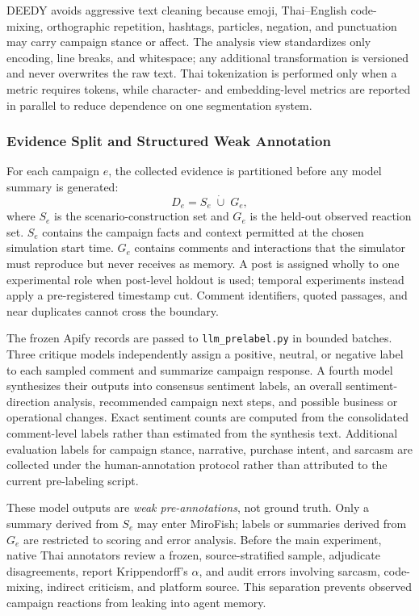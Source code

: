 \documentclass[conference]{IEEEtran}
\begin{document}
DEEDY avoids aggressive text cleaning because emoji, Thai--English
code-mixing, orthographic repetition, hashtags, particles, negation, and
punctuation may carry campaign stance or affect. The analysis view standardizes
only encoding, line breaks, and whitespace; any additional transformation is
versioned and never overwrites the raw text. Thai tokenization is performed
only when a metric requires tokens, while character- and embedding-level
metrics are reported in parallel to reduce dependence on one segmentation
system.

\subsubsection{Evidence Split and Structured Weak Annotation}

For each campaign $e$, the collected evidence is partitioned before any model
summary is generated:
\begin{equation}
    D_e = S_e \;\dot\cup\; G_e,
\end{equation}
where $S_e$ is the scenario-construction set and $G_e$ is the held-out observed
reaction set. $S_e$ contains the campaign facts and context permitted at the
chosen simulation start time. $G_e$ contains comments and interactions that
the simulator must reproduce but never receives as memory. A post is assigned
wholly to one experimental role when post-level holdout is used; temporal
experiments instead apply a pre-registered timestamp cut. Comment identifiers,
quoted passages, and near duplicates cannot cross the boundary.

The frozen Apify records are passed to \texttt{llm\_prelabel.py} in bounded
batches. Three critique models independently assign a positive, neutral, or
negative label to each sampled comment and summarize campaign response. A
fourth model synthesizes their outputs into consensus sentiment labels, an
overall sentiment-direction analysis, recommended campaign next steps, and
possible business or operational changes. Exact sentiment counts are computed
from the consolidated comment-level labels rather than estimated from the
synthesis text. Additional evaluation labels for campaign stance, narrative,
purchase intent, and sarcasm are collected under the human-annotation protocol
rather than attributed to the current pre-labeling script.

These model outputs are \emph{weak pre-annotations}, not ground truth. Only a
summary derived from $S_e$ may enter MiroFish; labels or summaries derived from
$G_e$ are restricted to scoring and error analysis. Before the main experiment,
native Thai annotators review a frozen, source-stratified sample, adjudicate
disagreements, report Krippendorff's $\alpha$, and audit errors involving
sarcasm, code-mixing, indirect criticism, and platform source. This separation
prevents observed campaign reactions from leaking into agent memory.
\end{document}
